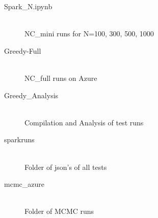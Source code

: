 \documentclass{article}
\begin{document}
			\begin{description}
				\item[Spark\_N.ipynb] \hfill \\
				NC\_mini runs for N=100, 300, 500, 1000
				\item[Greedy-Full] \hfill \\
				NC\_full runs on Azure
				\item[Greedy\_Analysis] \hfill \\
				Compilation and Analysis of test runs
				\item[sparkruns] \hfill \\
				Folder of json's of all tests
				\item[mcmc\_azure] \hfill \\
				Folder of MCMC runs
			\end{description}
	
	
\end{document}
